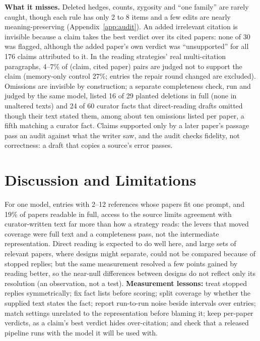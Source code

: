 \documentclass{article} %
\begin{document}
\textbf{What it misses.} Deleted hedges, counts, zygosity and ``one family'' are rarely caught, though each rule has only 2 to 8 items and a few edits are nearly meaning-preserving (Appendix~\ref{app:audit}). An added irrelevant citation is invisible because a claim takes the best verdict over its cited papers: none of 30 was flagged, although the added paper's own verdict was ``unsupported'' for all 176 claims attributed to it. In the reading strategies' real multi-citation paragraphs, 4--7\% of (claim, cited paper) pairs are judged not to support the claim (memory-only control 27\%; entries the repair round changed are excluded). Omissions are invisible by construction; a separate completeness check, run and judged by the same model, listed 16 of 29 planted deletions in full (none in unaltered texts) and 24 of 60 curator facts that direct-reading drafts omitted though their text stated them, among about ten omissions listed per paper, a fifth matching a curator fact. Claims supported only by a later paper's passage pass an audit against what the writer saw, and the audit checks fidelity, not correctness: a draft that copies a source's error passes.

\section{Discussion and Limitations}
\label{sec:discussion}
For one model, entries with 2--12 references whose papers fit one prompt, and 19\% of papers readable in full, access to the source limits agreement with curator-written text far more than how a strategy reads: the levers that moved coverage were full text and a completeness pass, not the intermediate representation. Direct reading is expected to do well here, and large sets of relevant papers, where designs might separate, could not be compared because of stopped replies; but the same measurement resolved a few points gained by reading better, so the near-null differences between designs do not reflect only its resolution (an observation, not a test). \textbf{Measurement lessons:} treat stopped replies symmetrically; fix fact lists before scoring; split coverage by whether the supplied text states the fact; report run-to-run noise beside intervals over entries; match settings unrelated to the representation before blaming it; keep per-paper verdicts, as a claim's best verdict hides over-citation; and check that a released pipeline runs with the model it will be used with.
\end{document}
